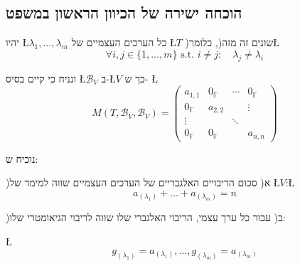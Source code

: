 \documentclass[english,hebrew]{article}
\begin{document}
\subsection{הוכחה ישירה של הכיוון הראשון במשפט}

יהיו \L{$\lambda_{1},\dots,\lambda_{m}$} כל הערכים העצמיים של \L{$T$}
)שונים זה מזה(, כלומר\L{%
\[
\forall i,j\in\{1,\dots,m\}\text{ s.t. }i\neq j:\quad\lambda_{j}\neq\lambda_{i}
\]
}%

ונניח כי קיים בסיס \L{$\mathcal{B}_{V}$} ב-\L{$V$} כך ש- \L{%
\[
M(T,\mathcal{B}_{V},\mathcal{B}_{V})=\begin{pmatrix}a_{1,1} & 0_{\mathbb{F}} & \cdots & 0_{\mathbb{F}}\\
0_{\mathbb{F}} & a_{2,2} &  & \vdots\\
\vdots &  & \ddots\\
0_{\mathbb{F}} & 0_{\mathbb{F}} &  & a_{n,n}
\end{pmatrix}
\]
}%

נוכיח ש:

)א( סכום הריבויים האלגבריים של הערכים העצמיים שווה למימד של \L{$V$}:\L{%
\[
a_{\left(\lambda_{1}\right)}+\dots+a_{\left(\lambda_{m}\right)}=n
\]
}%

)ב( עבור כל ערך עצמי, הריבוי האלגברי שלו שווה לריבוי הגיאומטרי שלו:

\L{%
\[
g_{\left(\lambda_{1}\right)}=a_{\left(\lambda_{1}\right)},\dots,g_{\left(\lambda_{m}\right)}=a_{\left(\lambda_{m}\right)}
\]
}%
\end{document}
